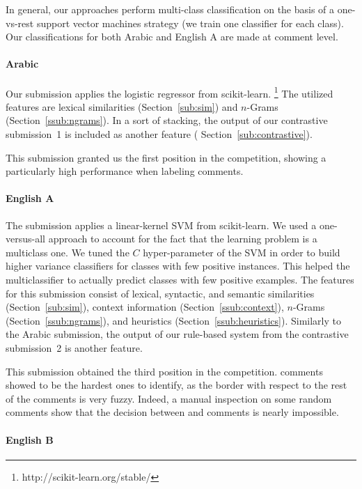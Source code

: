 In general, our approaches perform multi-class classification on the basis of a 
one-vs-rest support vector machines strategy (\ie we train one classifier for 
each class). Our classifications for both Arabic and English A are made at 
comment level.


\paragraph{Arabic} 
Our submission applies the logistic regressor from scikit-learn.%
\footnote{http://scikit-learn.org/stable/}
The utilized features are lexical similarities (Section~\ref{sub:sim}) and  
$n$-Grams (Section~\ref{ssub:ngrams}). In a sort of stacking, the output of 
our contrastive submission~1 is included as another feature (\cf 
Section~\ref{sub:contrastive}). 

This submission granted us the first position in the competition, showing a 
particularly high performance when labeling \rel comments.

\paragraph{English A}
The submission applies a linear-kernel SVM from scikit-learn. We used a 
one-versus-all approach to account for the fact that the learning problem is a 
multiclass one. We tuned the $C$ hyper-parameter of the SVM in order to build 
higher variance classifiers for classes with few positive instances. This 
helped the multiclassifier to actually predict classes with few positive 
examples. The features for this submission consist of lexical, syntactic, and 
semantic similarities (Section~\ref{sub:sim}), context information 
(Section~\ref{ssub:context}), $n$-Grams (Section~\ref{ssub:ngrams}), and 
heuristics (Section~\ref{ssub:heuristics}). Similarly to the Arabic submission, 
the output of our rule-based system from the contrastive submission~2 is 
another feature. 

This submission obtained the third position in the competition. \pot comments 
showed to be the hardest ones to identify, as the border with respect to the 
rest of the comments is very fuzzy. Indeed, a manual inspection on some 
random comments show that the decision between \good and \pot comments is nearly 
impossible.

\paragraph{English B}

